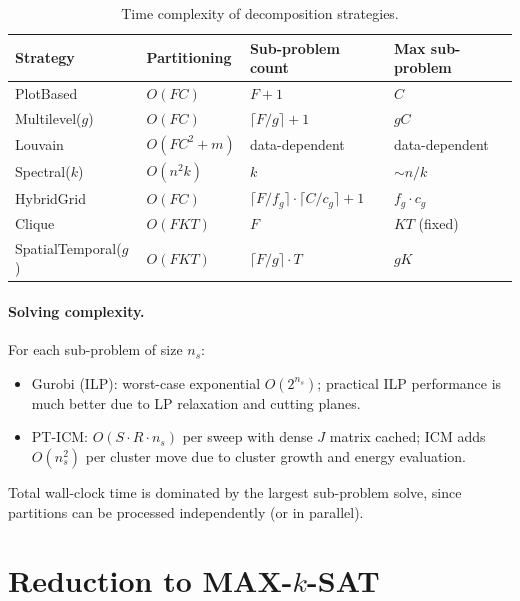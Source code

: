 \documentclass[11pt,a4paper]{article}
\begin{document}
\begin{table}[H]
\centering
\caption{Time complexity of decomposition strategies.}
\label{tab:complexity}
\begin{tabular}{llll}
\toprule
\textbf{Strategy} & \textbf{Partitioning} & \textbf{Sub-problem count} & \textbf{Max sub-problem} \\
\midrule
PlotBased         & $O(FC)$        & $F + 1$                       & $C$ \\
Multilevel($g$)   & $O(FC)$        & $\lceil F/g \rceil + 1$       & $gC$ \\
Louvain           & $O(FC^2 + m)$  & data-dependent                & data-dependent \\
Spectral($k$)     & $O(n^2 k)$     & $k$                           & $\sim n/k$ \\
HybridGrid        & $O(FC)$        & $\lceil F/f_g\rceil \cdot \lceil C/c_g\rceil + 1$ & $f_g \cdot c_g$ \\
Clique            & $O(FKT)$       & $F$                           & $KT$ (fixed) \\
SpatialTemporal($g$) & $O(FKT)$    & $\lceil F/g\rceil \cdot T$    & $gK$ \\
\bottomrule
\end{tabular}
\end{table}

\paragraph{Solving complexity.}
For each sub-problem of size $n_s$:
\begin{itemize}
  \item Gurobi (ILP): worst-case exponential $O(2^{n_s})$; practical ILP performance
    is much better due to LP relaxation and cutting planes.
  \item PT-ICM: $O(S \cdot R \cdot n_s)$ per sweep with dense $J$ matrix cached;
    ICM adds $O(n_s^2)$ per cluster move due to cluster growth and energy evaluation.
\end{itemize}

Total wall-clock time is dominated by the largest sub-problem solve, since partitions
can be processed independently (or in parallel).

\section{Reduction to MAX-$k$-SAT}
\label{sec:maxsat}
\end{document}
